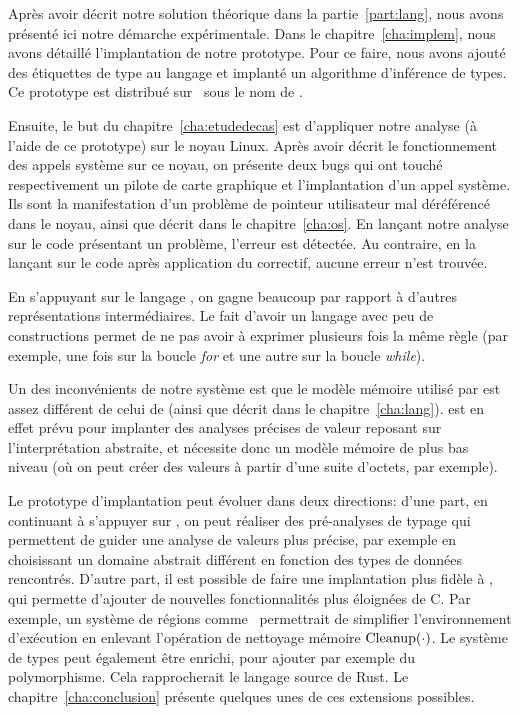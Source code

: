 Après avoir décrit notre solution théorique dans la partie~\ref{part:lang}, nous
avons présenté ici notre démarche expérimentale. Dans le
chapitre~\ref{cha:implem}, nous avons détaillé l'implantation de notre
prototype. Pour ce faire, nous avons ajouté des étiquettes de type au langage
\newspeak et implanté un algorithme d'inférence de types. Ce prototype est
distribué sur~ sous le nom de \ptrtype.

Ensuite, le but du chapitre~\ref{cha:etudedecas} est d'appliquer notre analyse
(à l'aide de ce prototype) sur le noyau Linux. Après avoir décrit le
fonctionnement des appels système sur ce noyau, on présente deux bugs qui ont
touché respectivement un pilote de carte graphique et l'implantation d'un appel
système. Ils sont la manifestation d'un problème de pointeur utilisateur mal
déréférencé dans le noyau, ainsi que décrit dans le chapitre~\ref{cha:os}. En
lançant notre analyse sur le code présentant un problème, l'erreur est détectée.
Au contraire, en la lançant sur le code après application du correctif, aucune
erreur n'est trouvée.

En s'appuyant sur le langage \newspeak, on gagne beaucoup par rapport à d'autres
représentations intermédiaires. Le fait d'avoir un langage avec peu de
constructions permet de ne pas avoir à exprimer plusieurs fois la même règle
(par exemple, une fois sur la boucle \emph{for} et une autre sur la boucle
\emph{while}).

\label{page:ccl-npk-spk}

Un des inconvénients de notre système est que le modèle mémoire utilisé par
\newspeak est assez différent de celui de \langname (ainsi que décrit dans le
chapitre~\ref{cha:lang}). \newspeak est en effet prévu pour implanter des
analyses précises de valeur reposant sur l'interprétation abstraite, et
nécessite donc un modèle mémoire de plus bas niveau (où on peut créer des
valeurs à partir d'une suite d'octets, par exemple).

Le prototype d'implantation peut évoluer dans deux directions: d'une part, en
continuant à s'appuyer sur \newspeak, on peut réaliser des pré-analyses de
typage qui permettent de guider une analyse de valeurs plus précise, par exemple
en choisissant un domaine abstrait différent en fonction des types de données
rencontrés. D'autre part, il est possible de faire une implantation plus fidèle
à \langname, qui permette d'ajouter de nouvelles fonctionnalités plus éloignées
de C. Par exemple, un système de régions comme~\cite{jfp92} permettrait de
simplifier l'environnement d'exécution en enlevant l'opération de nettoyage
mémoire $\mathrm{Cleanup}(\cdot)$. Le système de types peut également être enrichi, pour
ajouter par exemple du polymorphisme. Cela rapprocherait le langage source de
Rust. Le chapitre~\ref{cha:conclusion} présente quelques unes de ces extensions
possibles.

